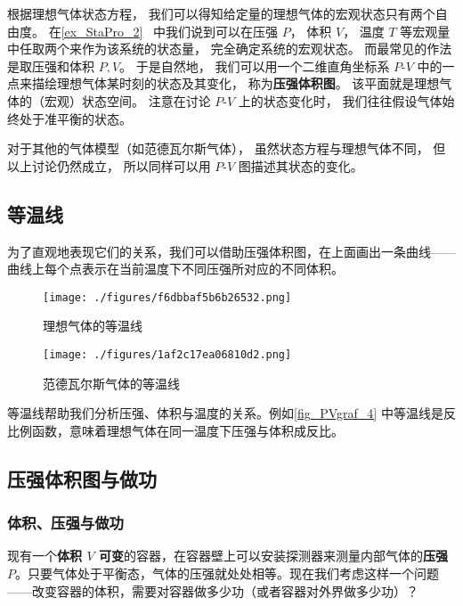
\begin{issues}
\issueDraft
\end{issues}


根据理想气体状态方程， 我们可以得知给定量的理想气体的宏观状态只有两个自由度。 在\autoref{ex_StaPro_2}~ 中我们说到可以在压强 $P$， 体积 $V$， 温度 $T$ 等宏观量中任取两个来作为该系统的状态量， 完全确定系统的宏观状态。 而最常见的作法是取压强和体积 $P,V$。 于是自然地， 我们可以用一个二维直角坐标系 $P$-$V$ 中的一点来描绘理想气体某时刻的状态及其变化， 称为\textbf{压强体积图}。 该平面就是理想气体的（宏观）状态空间。 注意在讨论 $P$-$V$ 上的状态变化时， 我们往往假设气体始终处于准平衡的状态。

对于其他的气体模型（如范德瓦尔斯气体）， 虽然状态方程与理想气体不同， 但以上讨论仍然成立， 所以同样可以用 $P$-$V$ 图描述其状态的变化。


\subsection{等温线}
为了直观地表现它们的关系，我们可以借助压强体积图，在上面画出一条曲线——曲线上每个点表示在当前温度下不同压强所对应的不同体积。
\begin{figure}[ht]
\centering
\texttt{[image: ./figures/f6dbbaf5b6b26532.png]}
\caption{理想气体的等温线} \label{fig_PVgraf_4}
\end{figure}
\begin{figure}[ht]
\centering
\texttt{[image: ./figures/1af2c17ea06810d2.png]}
\caption{范德瓦尔斯气体的等温线} \label{fig_PVgraf_3}
\end{figure}

等温线帮助我们分析压强、体积与温度的关系。例如\autoref{fig_PVgraf_4} 中等温线是反比例函数，意味着理想气体在同一温度下压强与体积成反比。

\subsection{压强体积图与做功}

\subsubsection{体积、压强与做功}
现有一个\textbf{体积 $V$ 可变}的容器，在容器壁上可以安装探测器来测量内部气体的\textbf{压强 $P$}。只要气体处于平衡态，气体的压强就处处相等。现在我们考虑这样一个问题——改变容器的体积，需要对容器做多少功（或者容器对外界做多少功）？

